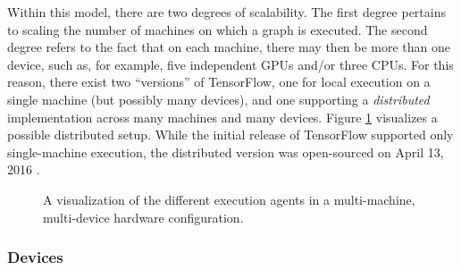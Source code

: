 Within this model, there are two degrees of scalability. The first degree
pertains to scaling the number of machines on which a graph is executed. The
second degree refers to the fact that on each machine, there may then be more
than one device, such as, for example, five independent GPUs and/or three
CPUs. For this reason, there exist two ``versions'' of TensorFlow, one for local
execution on a single machine (but possibly many devices), and one supporting a
\emph{distributed} implementation across many machines and many devices. Figure
\ref{fig:exec} visualizes a possible distributed setup. While the initial
release of TensorFlow supported only single-machine execution, the distributed
version was open-sourced on April 13, 2016 \cite{tensorflowdist}.

\begin{figure}
  \caption{A visualization of the different execution agents in a multi-machine,
    multi-device hardware configuration.}
  \label{fig:exec}
\end{figure}

\subsubsection{Devices}\label{sec:model-exec-devices}


